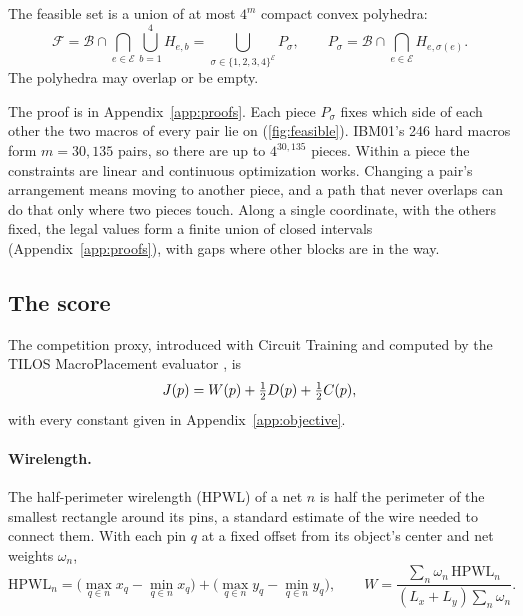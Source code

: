 \begin{proposition}\label{prop:geometry}
The feasible set is a union of at most $4^m$ compact convex polyhedra:
\begin{equation}
 \mathcal F
 =\mathcal B\cap\bigcap_{e\in\mathcal E}\bigcup_{b=1}^4 H_{e,b}
 =\bigcup_{\sigma\in\{1,2,3,4\}^{\mathcal E}} P_\sigma,
 \qquad
 P_\sigma=\mathcal B\cap\bigcap_{e\in\mathcal E}H_{e,\sigma(e)}.
 \label{eq:polyhedral-union}
\end{equation}
The polyhedra may overlap or be empty.
\end{proposition}
\noindent The proof is in Appendix~\ref{app:proofs}. Each piece $P_\sigma$ fixes
which side of each other the two macros of every pair lie on (\cref{fig:feasible}).
IBM01's 246 hard macros form $m=30{,}135$ pairs, so there are up to $4^{30{,}135}$
pieces. Within a piece the constraints are linear and continuous optimization works.
Changing a pair's arrangement means moving to another piece, and a path that never
overlaps can do that only where two pieces touch. Along a single coordinate, with the
others fixed, the legal values form a finite union of closed intervals
(Appendix~\ref{app:proofs}), with gaps where other blocks are in the way.

\subsection{The score}\label{sec:score}\label{sec:tail-analysis}

The competition proxy, introduced with Circuit Training \citep{mirhoseini2021graph}
and computed by the TILOS MacroPlacement evaluator \citep{macroplacement}, is
\begin{equation}
  J(p)=W(p)+\tfrac12 D(p)+\tfrac12 C(p),
  \label{eq:canonical}
\end{equation}
with every constant given in Appendix~\ref{app:objective}.

\paragraph{Wirelength.} The half-perimeter wirelength (HPWL) of a net $n$ is half
the perimeter of the smallest rectangle around its pins, a standard estimate of the
wire needed to connect them. With each pin $q$ at a fixed offset from its object's
center and net weights $\omega_n$,
\[
 \mathrm{HPWL}_n=\bigl(\max_{q\in n}x_q-\min_{q\in n}x_q\bigr)
 +\bigl(\max_{q\in n}y_q-\min_{q\in n}y_q\bigr),
 \qquad
 W=\frac{\sum_n\omega_n\,\mathrm{HPWL}_n}{(L_x+L_y)\sum_n\omega_n}.
\]

